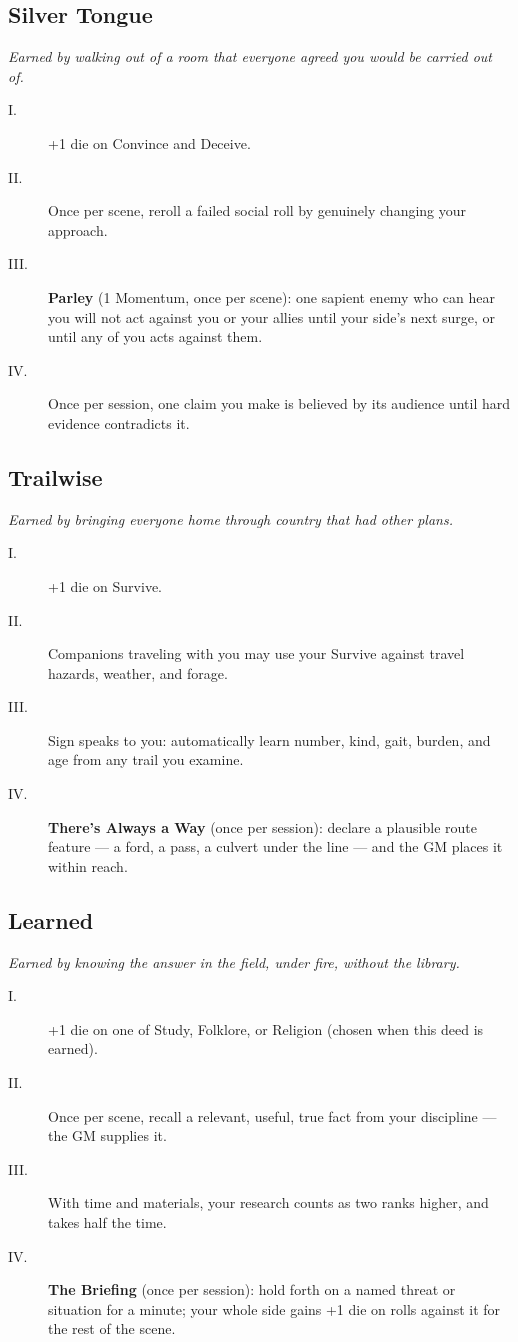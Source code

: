 \subsection{Silver Tongue}
\textit{Earned by walking out of a room that everyone agreed you would be carried out of.}
\begin{description}
    \item[I.] +1 die on Convince and Deceive.
    \item[II.] Once per scene, reroll a failed social roll by genuinely changing your approach.
    \item[III.] \textbf{Parley} (1 Momentum, once per scene): one sapient enemy who can hear you will not act against you or your allies until your side's next surge, or until any of you acts against them.
    \item[IV.] Once per session, one claim you make is believed by its audience until hard evidence contradicts it.
\end{description}

\subsection{Trailwise}
\textit{Earned by bringing everyone home through country that had other plans.}
\begin{description}
    \item[I.] +1 die on Survive.
    \item[II.] Companions traveling with you may use your Survive against travel hazards, weather, and forage.
    \item[III.] Sign speaks to you: automatically learn number, kind, gait, burden, and age from any trail you examine.
    \item[IV.] \textbf{There's Always a Way} (once per session): declare a plausible route feature --- a ford, a pass, a culvert under the line --- and the GM places it within reach.
\end{description}

\subsection{Learned}
\textit{Earned by knowing the answer in the field, under fire, without the library.}
\begin{description}
    \item[I.] +1 die on one of Study, Folklore, or Religion (chosen when this deed is earned).
    \item[II.] Once per scene, recall a relevant, useful, true fact from your discipline --- the GM supplies it.
    \item[III.] With time and materials, your research counts as two ranks higher, and takes half the time.
    \item[IV.] \textbf{The Briefing} (once per session): hold forth on a named threat or situation for a minute; your whole side gains +1 die on rolls against it for the rest of the scene.
\end{description}

